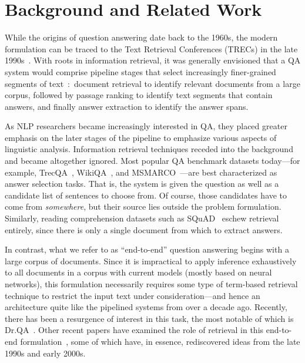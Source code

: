 \documentclass[11pt,a4paper]{article}
\begin{document}
\section{Background and Related Work}

While the origins of question answering date back to the 1960s, the modern formulation can be traced to the Text Retrieval Conferences (TRECs) in the late 1990s~\cite{Voorhees_Tice_TREC8}.
With roots in information retrieval, it was generally envisioned that a QA system would comprise pipeline stages that select increasingly finer-grained segments of text~\cite{Tellex_etal_SIGIR2003}:\ document retrieval to identify relevant documents from a large corpus, followed by passage ranking to identify text segments that contain answers, and finally answer extraction to identify the answer spans.

As NLP researchers became increasingly interested in QA, they placed greater emphasis on the later stages of the pipeline to emphasize various aspects of linguistic analysis.
Information retrieval techniques receded into the background and became altogether ignored.
Most popular QA benchmark datasets today---for example, TrecQA~\cite{Yao13answerextraction}, WikiQA~\cite{yang2015wikiqa}, and MSMARCO~\cite{nguyen2016ms}---are best characterized as answer selection tasks.	
That is, the system is given the question as well as a candidate list of sentences to choose from.
Of course, those candidates have to come from {\it somewhere}, but their source lies outside the problem formulation.
Similarly, reading comprehension datasets such as SQuAD~\cite{D16-1264} eschew retrieval entirely, since there is only a single document from which to extract answers.

In contrast, what we refer to as ``end-to-end'' question answering begins with a large corpus of documents.
Since it is impractical to apply inference exhaustively to all documents in a corpus with current models (mostly based on neural networks), this formulation necessarily requires some type of term-based retrieval technique to restrict the input text under consideration---and hence an architecture quite like the pipelined systems from over a decade ago.
Recently, there has been a resurgence of interest in this task, the most notable of which is Dr.QA~\citep{P17-1171}.
Other recent papers have examined the role of retrieval in this end-to-end formulation~\citep{wang2017r,D18-1055,D18-1053}, some of which have, in essence, rediscovered ideas from the late 1990s and early 2000s.
\end{document}

